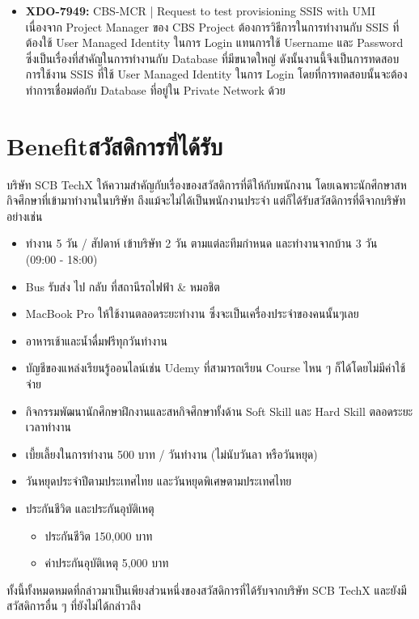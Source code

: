 \begin{itemize}
      \item \textbf{XDO-7949:} CBS-MCR | Request to test provisioning SSIS with UMI\\
            เนื่องจาก Project Manager ของ CBS Project ต้องการวิธีการในการทำงานกับ SSIS ที่ต้องใช้ User Managed Identity ในการ Login แทนการใช้ Username และ Password ซึ่งเป็นเรื่องที่สำคัญในการทำงานกับ Database ที่มีขนาดใหญ่ ดังนั้นงานนี้จึงเป็นการทดสอบการใช้งาน SSIS ที่ใช้ User Managed Identity ในการ Login โดยที่การทดสอบนั้นจะต้องทำการเชื่อมต่อกับ Database ที่อยู่ใน Private Network ด้วย
\end{itemize}

\section{\ifenglish Benefit\else สวัสดิการที่ได้รับ\fi}
บริษัท SCB TechX ให้ความสำคัญกับเรื่องของสวัสดิการที่ดีให้กับพนักงาน โดยเฉพาะนักศึกษาสหกิจศึกษาที่เข้ามาทำงานในบริษัท
ถึงแม้จะไม่ได้เป็นพนักงานประจำ แต่ก็ได้รับสวัสดิการที่ดีจากบริษัทอย่างเช่น
\begin{itemize}
      \item ทำงาน 5 วัน / สัปดาห์ เข้าบริษัท 2 วัน ตามแต่ละทีมกำหนด และทำงานจากบ้าน 3 วัน \\(09:00 - 18:00)
      \item Bus รับส่ง ไป กลับ ที่สถานีรถไฟฟ้า \& หมอชิต
      \item MacBook Pro ให้ใช้งานตลอดระยะทำงาน ซึ่งจะเป็นเครื่องประจำของคนนั้นๆเลย
      \item อาหารเช้าและน้ำดื่มฟรีทุกวันทำงาน
      \item บัญชีของแหล่งเรียนรู้ออนไลน์เช่น Udemy ที่สามารถเรียน Course ไหน ๆ ก็ได้โดยไม่มีค่าใช้จ่าย
      \item กิจกรรมพัฒนานักศึกษาฝึกงานและสหกิจศึกษาทั้งด้าน Soft Skill และ Hard Skill ตลอดระยะเวลาทำงาน
      \item เบี้ยเลี้ยงในการทำงาน 500 บาท / วันทำงาน (ไม่นับวันลา หรือวันหยุด)
      \item วันหยุดประจำปีตามประเทศไทย และวันหยุดพิเศษตามประเทศไทย
      \item ประกันชีวิต และประกันอุบัติเหตุ
            \begin{itemize}
                  \item ประกันชีวิต 150,000 บาท
                  \item ค่าประกันอุบัติเหตุ 5,000 บาท
            \end{itemize}
\end{itemize}
ทั้งนี้ทั้งหมดหมดที่กล่าวมาเป็นเพียงส่วนหนึ่งของสวัสดิการที่ได้รับจากบริษัท SCB TechX และยังมีสวัสดิการอื่น ๆ ที่ยังไม่ได้กล่าวถึง

